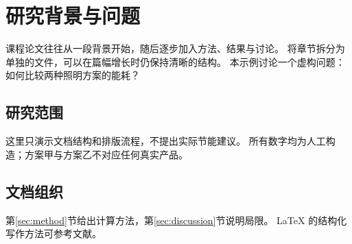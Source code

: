 \section{研究背景与问题}
\label{sec:introduction}
课程论文往往从一段背景开始，随后逐步加入方法、结果与讨论。
将章节拆分为单独的文件，可以在篇幅增长时仍保持清晰的结构。
本示例讨论一个虚构问题：如何比较两种照明方案的能耗？
\subsection{研究范围}
这里只演示文档结构和排版流程，不提出实际节能建议。
所有数字均为人工构造；方案甲与方案乙不对应任何真实产品。
\subsection{文档组织}
第\ref{sec:method}节给出计算方法，第\ref{sec:discussion}节说明局限。
LaTeX 的结构化写作方法可参考文献\cite{latex1994}。
